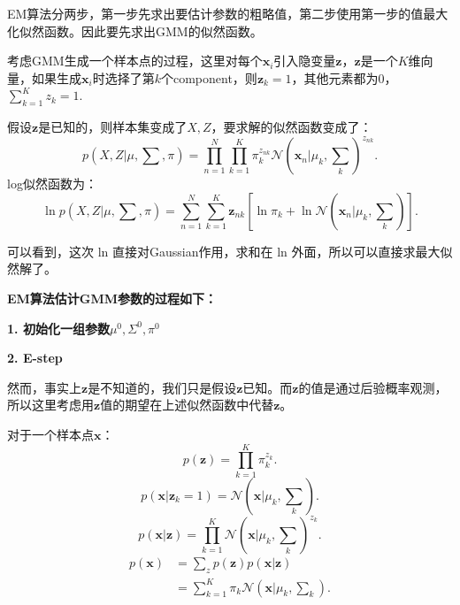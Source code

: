 \documentclass[UTF8]{ctexart}
\begin{document}
EM算法分两步，第一步先求出要估计参数的粗略值，第二步使用第一步的值最大化似然函数。因此要先求出GMM的似然函数。

考虑GMM生成一个样本点的过程，这里对每个$\mathbf x_i$引入隐变量$\mathbf z$，$\mathbf z$是一个$K$维向量，如果生成$\mathbf x_i$时选择了第$k$个component，则$\mathbf z_k=1$，其他元素都为0，$\sum_{k=1}^{K}z_k=1$.

假设$\mathbf z$是已知的，则样本集变成了${X,Z}$，要求解的似然函数变成了：
\begin{equation}
  p\left(X,Z\big|\mu,\sum,\pi\right) = \prod_{n=1}^N\prod_{k=1}^K\pi_k^{z_{nk}}\mathcal N\left(\mathbf x_n\big|\mu_k,\sum_k\right)^{z_{nk}}.
\end{equation}
log似然函数为：
\begin{equation}\label{loglikelihood}
  \ln p\left(X,Z\big|\mu,\sum,\pi\right) = \sum_{n=1}^N\sum_{k=1}^K\mathbf z_{nk}\left[\ln\pi_k + \ln\mathcal N\left(\mathbf x_n\big|\mu_k,\sum_k\right)\right].
\end{equation}

可以看到，这次 ln 直接对Gaussian作用，求和在 ln 外面，所以可以直接求最大似然解了。

\textbf{EM算法估计GMM参数的过程如下：}

\textbf{1. 初始化一组参数$\mu ^0,\Sigma ^0,\pi ^0$}

\textbf{2. E-step}

然而，事实上$\mathbf z$是不知道的，我们只是假设$\mathbf z$已知。而$\mathbf z$的值是通过后验概率观测，所以这里考虑用$\mathbf z$值的期望在上述似然函数中代替$\mathbf z$。

对于一个样本点$\mathbf x$：
\begin{equation}
  p(\mathbf z) = \prod_{k=1}^K\pi_k^{z_k}.
\end{equation}
\begin{equation}
  p(\mathbf x|\mathbf z_k=1) = \mathcal N\left(\mathbf x\big|\mu_k,\sum_k\right).
\end{equation}
\begin{equation}
  p(\mathbf x|\mathbf z) = \prod_{k=1}^K\mathcal N\left(\mathbf x\big|\mu_k,\sum_k\right)^{z_k}.
\end{equation}
\begin{equation}
  \begin{split}
    p(\mathbf x) &= \sum_zp(\mathbf z)p(\mathbf x|\mathbf z)\\
    &= \sum_{k=1}^K\pi_k\mathcal N\left(\mathbf x\big|\mu_k,\sum_k\right).
  \end{split}
\end{equation}
\end{document}
